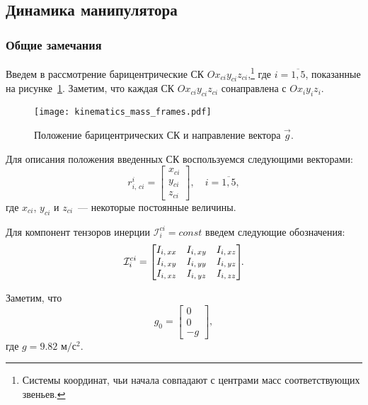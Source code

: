 \subsection{Динамика манипулятора}\label{part_dynamics}

\subsubsection{Общие замечания}
Введем в рассмотрение барицентрические СК $Ox_{ci}y_{ci}z_{ci}$\lefteqn,\footnote{Системы координат, чьи начала совпадают с центрами масс соответствующих звеньев.} где $i=\overline{1,5}$, показанные на рисунке~\ref{img_mass_frames}.
Заметим, что каждая СК $Ox_{ci}y_{ci}z_{ci}$ сонаправлена с $Ox_iy_iz_i$.

\begin{figure}[h!]
	\centering\texttt{[image: kinematics\_mass\_frames.pdf]}
	\caption{Положение барицентрических СК и направление вектора $\vec{g}$.}
	\label{img_mass_frames}
\end{figure}

Для описания положения введенных СК воспользуемся следующими векторами:
\begin{equation}
    r^i_{i,\,ci} =
    \begin{bmatrix}
        x_{ci} \\ y_{ci} \\ z_{ci}
    \end{bmatrix}\!\!,\quad i = \overline{1,5},
\end{equation}
где $x_{ci}$, $y_{ci}$ и $z_{ci}$~--- некоторые постоянные величины.

Для компонент тензоров инерции $\mathcal{I}^{ci}_i = const$ введем следующие обозначения:
\begin{equation}
    \mathcal{I}^{ci}_i =
    \begin{bmatrix}
        I_{i,\,xx} & I_{i,\,xy} & I_{i,\,xz} \\
        I_{i,\,xy} & I_{i,\,yy} & I_{i,\,yz} \\
        I_{i,\,xz} & I_{i,\,yz} & I_{i,\,zz}
    \end{bmatrix}\!\!\ldotp
\end{equation}

Заметим, что
\begin{equation}
    g_0 =
    \begin{bmatrix}
        0 \\ 0 \\ -g
    \end{bmatrix}\!\!,
\end{equation}
где $g=9.82\text{ м}/\text{с}^2$.

